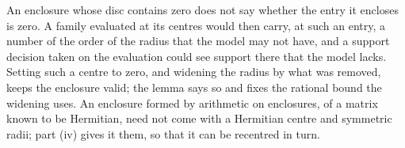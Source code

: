 
An enclosure whose disc contains zero does not say whether the entry it
encloses is zero. A family evaluated at its centres would then carry, at such
an entry, a number of the order of the radius that the model may not have,
and a support decision taken on the evaluation could see support there that
the model lacks. Setting such a centre to zero, and widening the radius by
what was removed, keeps the enclosure valid; the lemma says so and fixes the
rational bound the widening uses. An enclosure formed by arithmetic on
enclosures, of a matrix known to be Hermitian, need not come with a Hermitian
centre and symmetric radii; part (iv) gives it them, so that it can be
recentred in turn.

